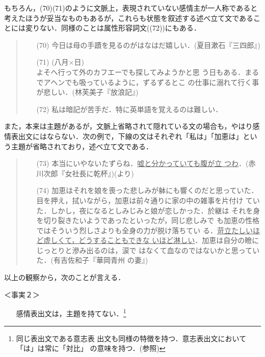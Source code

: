 もちろん，(70)(71)のように文脈上，表現されていない感情主が一人称であると
考えたほうが妥当なものもあるが，これらも状態を叙述する述べ立て文であるこ
とには変りない．同様のことは属性形容詞文((72))にもある．

\vspace{0.3cm}
\begin{quote}
\begin{itemize}
 \item[(70)] 今日は母の手蹟を見るのがはなはだ嬉しい．(夏目漱石『三四郎』)
 \item[(71)] (八月×日)\\よそへ行って外のカフエーでも探してみようかと思
	     う日もある．まるでアヘンでも吸っているように，ずるずるとこ
	     の仕事に溺れて行く事が悲しい．(林芙美子『放浪記』)
 \item[(72)] 私は暗記が苦手だ．特に英単語を覚えるのは難しい．
\end{itemize}
\end{quote}
\vspace{0.3cm}

また，本来は主題があるが，文脈上省略されて隠れている文の場合も，やはり感
情表出文にはならない．次の例で，下線の文はそれぞれ「私は」「加恵は」とい
う主題が省略されており，述べ立て文である．

\vspace{0.3cm}
\begin{quote}
\begin{itemize}
 \item[(73)] 本当にいやないたずらね．\underline{嘘と分かっていても腹が立
	     つわ}．(赤川次郎『女社長に乾杯』)(\cite{山岡1997}より)
 \item[(74)] 加恵はそれを娘を喪った悲しみが躰にも響くのだと思っていた．
	     目を押え，拭いながら，加恵は前々通りに家の中の雑事を片付け
	     ていた．しかし，夜になるとしみじみと娘が恋しかった．於継は
	     それを身を切り裂きたいようであったといったが，同じ悲しみで
	     も加恵の性格ではそういう烈しさよりも全身の力が脱け落ちてい
	     る．\underline{苛立たしいほど虚しくて，どうすることもできな
	     いほど淋しい}．加恵は自分の瞼にじっとりと滲み出るのは，涙で
	     はなくて血なのではないかと思っていた．(有吉佐和子『華岡青州
	     の妻』)
\end{itemize}
\end{quote}
\vspace{0.3cm}

以上の観察から，次のことが言える．

＜事実２＞
\begin{itemize}
 \item[] 感情表出文は，主題を持てない．\footnote{同じ表出文である意志表
	 出文も同様の特徴を持つ．意志表出文において「は」は常に「対比」
	 の意味を持つ．(\cite{東1997}参照)}
\end{itemize}

